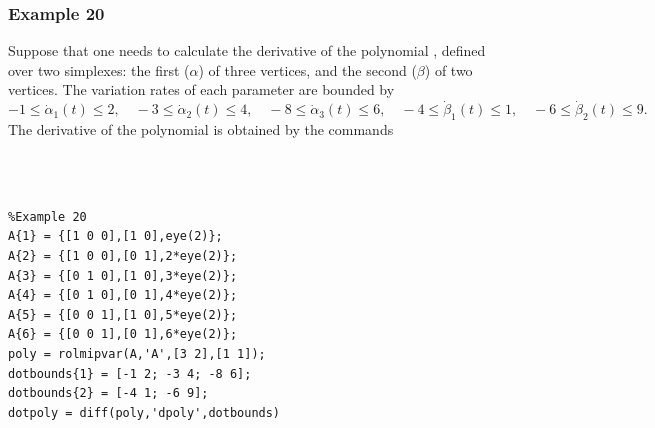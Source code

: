 \documentclass[english,11pt]{article}
\theoremstyle{break} \theorembodyfont{\small\rm}
\begin{document}
%        
%        
%        
%        
%        

\subsubsection*{Example 20}

Suppose that one needs to calculate the derivative of the polynomial , 
defined over two simplexes: the first ($\alpha$) of three vertices, and the second
($\beta$) of two vertices. The variation rates of each parameter are bounded by
\[
 -1 \leq \dot{\alpha}_1(t) \leq 2, \quad -3 \leq \dot{\alpha}_2(t) \leq 4, \quad 
 -8 \leq \dot{\alpha}_3(t) \leq 6, \quad 
 -4 \leq \dot{\beta}_1(t) \leq 1, \quad -6 \leq \dot{\beta}_2(t) \leq 9.
\]
The derivative of the polynomial is obtained by the commands

\vspace{0.5cm}%
\begin{minipage}{9.5cm}
\\
\\
\end{minipage}

\begin{minipage}{12.5cm}
 \begin{lstlisting}
%Example 20
A{1} = {[1 0 0],[1 0],eye(2)};
A{2} = {[1 0 0],[0 1],2*eye(2)};
A{3} = {[0 1 0],[1 0],3*eye(2)};
A{4} = {[0 1 0],[0 1],4*eye(2)};
A{5} = {[0 0 1],[1 0],5*eye(2)};
A{6} = {[0 0 1],[0 1],6*eye(2)};
poly = rolmipvar(A,'A',[3 2],[1 1]);
dotbounds{1} = [-1 2; -3 4; -8 6];
dotbounds{2} = [-4 1; -6 9];
dotpoly = diff(poly,'dpoly',dotbounds)
 \end{lstlisting}
\end{minipage}
\vspace{0.2cm}
\end{document}
